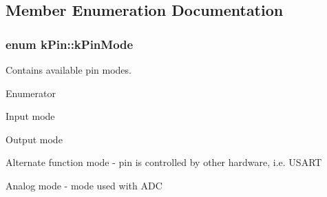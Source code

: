 \subsection{Member Enumeration Documentation}
\subsubsection[{\texorpdfstring{k\+Pin\+Mode}{kPinMode}}]{\setlength{\rightskip}{0pt plus 5cm}enum {\bf k\+Pin\+::k\+Pin\+Mode}}\hypertarget{classkPin_a311ea70432d9c48754eacc8d8ce8a949}{}\label{classkPin_a311ea70432d9c48754eacc8d8ce8a949}


Contains available pin modes. 

\begin{Desc}
\item[Enumerator]\par
\begin{description}
\item[{\em 
in\hypertarget{classkPin_a311ea70432d9c48754eacc8d8ce8a949a554230cb796f1567722de2f735e49aeb}{}\label{classkPin_a311ea70432d9c48754eacc8d8ce8a949a554230cb796f1567722de2f735e49aeb}
}]Input mode \item[{\em 
out\hypertarget{classkPin_a311ea70432d9c48754eacc8d8ce8a949acafa1712464c40b469cd18209d298967}{}\label{classkPin_a311ea70432d9c48754eacc8d8ce8a949acafa1712464c40b469cd18209d298967}
}]Output mode \item[{\em 
alternate\hypertarget{classkPin_a311ea70432d9c48754eacc8d8ce8a949a90e36f24bfc26ff0c10878e9339c0eef}{}\label{classkPin_a311ea70432d9c48754eacc8d8ce8a949a90e36f24bfc26ff0c10878e9339c0eef}
}]Alternate function mode -\/ pin is controlled by other hardware, i.\+e. U\+S\+A\+RT \item[{\em 
analog\hypertarget{classkPin_a311ea70432d9c48754eacc8d8ce8a949a38b78e28a019a75bc66237f45d5752a0}{}\label{classkPin_a311ea70432d9c48754eacc8d8ce8a949a38b78e28a019a75bc66237f45d5752a0}
}]Analog mode -\/ mode used with A\+DC \end{description}
\end{Desc}
